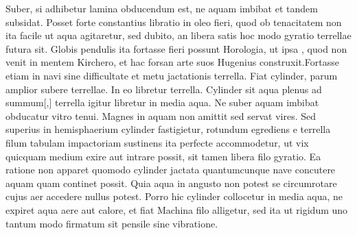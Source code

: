 Suber, si adhibetur lamina obducendum est, ne aquam imbibat et tandem subsidat. Posset forte constantius libratio in oleo fieri, quod ob tenacitatem non ita facile ut aqua agitaretur, sed dubito, an libera satis hoc modo gyratio terrellae futura sit. Globis pendulis ita fortasse fieri possunt Horologia\protect{}, ut ipsa , quod non venit in mentem Kirchero\protect{}, et hac forsan arte suos Hugenius\protect{} construxit.\pend \pstart Fortasse etiam in navi sine difficultate et metu jactationis  terrella. Fiat cylinder, parum amplior subere terrellae. In eo libretur terrella. Cylinder sit aqua plenus ad summum[,] terrella igitur libretur in media aqua. Ne suber aquam imbibat obducatur vitro tenui. Magnes\protect{} in aquam non amittit sed servat vires. Sed superius in hemisphaerium cylinder fastigietur,  rotundum egrediens e terrella filum tabulam impactoriam sustinens ita perfecte accommodetur, ut vix quicquam  medium exire aut intrare possit, sit tamen libera filo gyratio. Ea ratione non apparet quomodo cylinder jactata quantumcunque nave concutere aquam quam continet possit. Quia aqua in angusto non potest se circumrotare cujus aer accedere nullus potest. Porro hic cylinder collocetur in media aqua, ne expiret aqua aere aut calore, et fiat  Machina filo alligetur, sed ita ut rigidum uno tantum modo firmatum sit pensile sine vibratione. \pend 